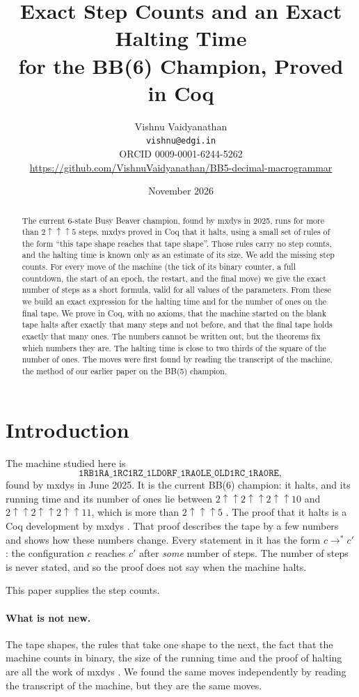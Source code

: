 \documentclass[11pt]{article}
\title{Exact Step Counts and an Exact Halting Time\\ for the BB(6) Champion, Proved in Coq}
\author{Vishnu Vaidyanathan\\
\small \texttt{vishnu@edgi.in}\\
\small ORCID 0009-0001-6244-5262\\
\small \url{https://github.com/VishnuVaidyanathan/BB5-decimal-macrogrammar}}
\date{November 2026}
\theoremstyle{remark}
\newcommand{\up}{\uparrow}
\begin{document}
\maketitle

\begin{abstract}
The current 6-state Busy Beaver champion, found by mxdys in 2025, runs for more
than $2\up\up\up 5$ steps. mxdys proved in Coq that it halts, using a small set
of rules of the form ``this tape shape reaches that tape shape''. Those rules
carry no step counts, and the halting time is known only as an estimate of its
size. We add the missing step counts. For every move of the machine (the tick
of its binary counter, a full countdown, the start of an epoch, the restart,
and the final move) we give the exact number of steps as a short formula, valid
for all values of the parameters. From these we build an exact expression for
the halting time and for the number of ones on the final tape. We prove in Coq,
with no axioms, that the machine started on the blank tape halts after exactly
that many steps and not before, and that the final tape holds exactly that many
ones. The numbers cannot be written out, but the theorems fix which numbers they
are. The halting time is close to two thirds of the square of the number of ones. The moves were first found by reading the transcript of the machine, the
method of our earlier paper on the BB(5) champion.
\end{abstract}

\section{Introduction}

The machine studied here is
\[
\texttt{1RB1RA\_1RC1RZ\_1LD0RF\_1RA0LE\_0LD1RC\_1RA0RE},
\]
found by mxdys in June 2025. It is the current BB(6) champion: it halts, and
its running time and its number of ones lie between $2\up\up 2\up\up 2\up\up 10$
and $2\up\up 2\up\up 2\up\up 11$, which is more than $2\up\up\up 5$
\cite{wiki}. The proof that it halts is a Coq development by mxdys \cite{mxdys}.
That proof describes the tape by a few numbers and shows how these numbers
change. Every statement in it has the form $c \to^{*} c'$: the configuration
$c$ reaches $c'$ after \emph{some} number of steps. The number of steps is never
stated, and so the proof does not say when the machine halts.

This paper supplies the step counts.

\paragraph{What is not new.} The tape shapes, the rules that take one shape to
the next, the fact that the machine counts in binary, the size of the running
time and the proof of halting are all the work of mxdys \cite{mxdys,wiki}. We
found the same moves independently by reading the transcript of the machine,
but they are the same moves.
\end{document}
